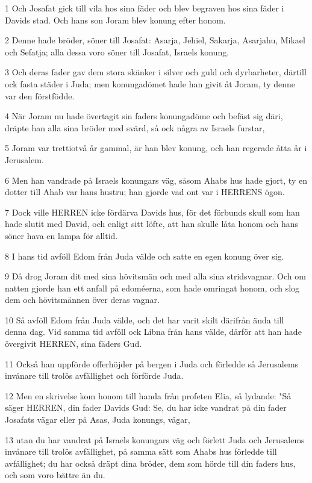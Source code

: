 \par 1 Och Josafat gick till vila hos sina fäder och blev begraven hos sina fäder i Davids stad. Och hans son Joram blev konung efter honom.
\par 2 Denne hade bröder, söner till Josafat: Asarja, Jehiel, Sakarja, Asarjahu, Mikael och Sefatja; alla dessa voro söner till Josafat, Israels konung.
\par 3 Och deras fader gav dem stora skänker i silver och guld och dyrbarheter, därtill ock fasta städer i Juda; men konungadömet hade han givit åt Joram, ty denne var den förstfödde.
\par 4 När Joram nu hade övertagit sin faders konungadöme och befäst sig däri, dräpte han alla sina bröder med svärd, så ock några av Israels furstar,
\par 5 Joram var trettiotvå år gammal, är han blev konung, och han regerade åtta år i Jerusalem.
\par 6 Men han vandrade på Israels konungars väg, såsom Ahabs hus hade gjort, ty en dotter till Ahab var hans hustru; han gjorde vad ont var i HERRENS ögon.
\par 7 Dock ville HERREN icke fördärva Davids hus, för det förbunds skull som han hade slutit med David, och enligt sitt löfte, att han skulle låta honom och hans söner hava en lampa för alltid.
\par 8 I hans tid avföll Edom från Juda välde och satte en egen konung över sig.
\par 9 Då drog Joram dit med sina hövitsmän och med alla sina stridsvagnar. Och om natten gjorde han ett anfall på edoméerna, som hade omringat honom, och slog dem och hövitsmännen över deras vagnar.
\par 10 Så avföll Edom från Juda välde, och det har varit skilt därifrån ända till denna dag. Vid samma tid avföll ock Libna från hans välde, därför att han hade övergivit HERREN, sina fäders Gud.
\par 11 Också han uppförde offerhöjder på bergen i Juda och förledde så Jerusalems invånare till trolös avfällighet och förförde Juda.
\par 12 Men en skrivelse kom honom till handa från profeten Elia, så lydande: "Så säger HERREN, din fader Davids Gud: Se, du har icke vandrat på din fader Josafats vägar eller på Asas, Juda konungs, vägar,
\par 13 utan du har vandrat på Israels konungars väg och förlett Juda och Jerusalems invånare till trolös avfällighet, på samma sätt som Ahabs hus förledde till avfällighet; du har också dräpt dina bröder, dem som hörde till din faders hus, och som voro bättre än du.
